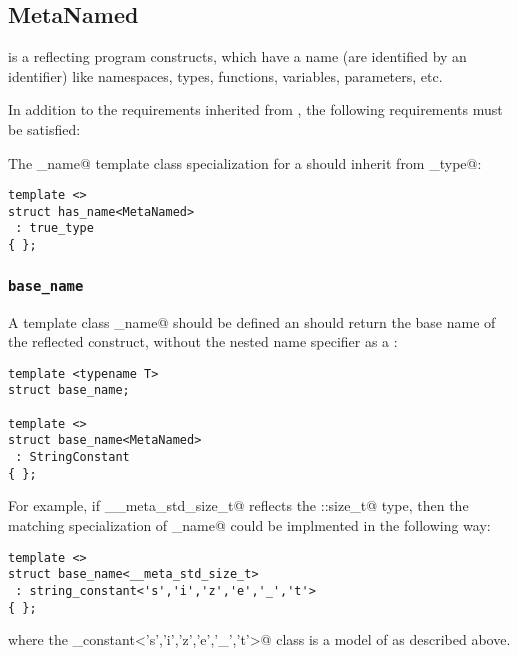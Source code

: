 \subsection{MetaNamed}
\label{concept-MetaNamed}


 is a  reflecting program constructs, which have a name
(are identified by an identifier) like namespaces, types, functions, variables, parameters, etc.

In addition to the requirements inherited from , the following requirements must
be satisfied:

The \verb@has_name@ template class specialization for a  should
inherit from \verb@true_type@:

\begin{verbatim}
template <>
struct has_name<MetaNamed>
 : true_type
{ };
\end{verbatim}

\subsubsection{\texttt{base\_name}}

A template class \verb@base_name@ should be defined an should return the base name
of the reflected construct, without the nested name specifier as a
:

\begin{verbatim}
template <typename T>
struct base_name;

template <>
struct base_name<MetaNamed>
 : StringConstant
{ };
\end{verbatim}

For example, if \verb@__meta_std_size_t@ reflects the \verb@std::size_t@ type,
then the matching specialization of \verb@base_name@ could be implmented in the following
way:

\begin{verbatim}
template <>
struct base_name<__meta_std_size_t>
 : string_constant<'s','i','z','e','_','t'>
{ };
\end{verbatim}

where the \verb@string_constant<'s','i','z','e','_','t'>@ class is a model
of  as described above.

